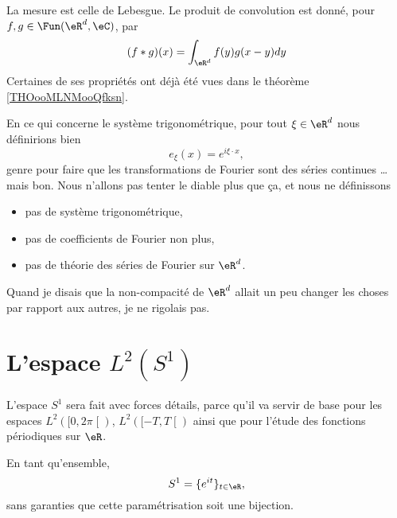 La mesure est celle de Lebesgue. Le produit de convolution est donné, pour \( f,g\in\Fun(\eR^d,\eC)\), par
\begin{equation}
    (f*g)(x)=\int_{\eR^d}f(y)g(x-y)dy
\end{equation}
Certaines de ses propriétés ont déjà été vues dans le théorème \ref{THOooMLNMooQfksn}.

En ce qui concerne le système trigonométrique, pour tout \( \xi\in \eR^d\) nous définirions bien
\begin{equation}
    e_{\xi}(x)= e^{i\xi\cdot x},
\end{equation}
genre pour faire que les transformations de Fourier sont des séries continues \ldots mais bon. Nous n'allons pas tenter le diable plus que ça, et nous ne définissons 
\begin{itemize}
    \item pas de système trigonométrique,
    \item pas de coefficients de Fourier non plus,
    \item pas de théorie des séries de Fourier sur \( \eR^d\).
\end{itemize}
Quand je disais que la non-compacité de \( \eR^d\) allait un peu changer les choses par rapport aux autres, je ne rigolais pas.

\section{L'espace \( L^2(S^1)\)}

L'espace \( S^1\) sera fait avec forces détails, parce qu'il va servir de base pour les espaces \( L^2(\mathopen[ 0 , 2\pi \mathclose[)\), \( L^2(\mathopen[ -T , T \mathclose[)\) ainsi que pour l'étude des fonctions périodiques sur \( \eR\).

En tant qu'ensemble,
\begin{equation}
    S^1=\{  e^{it} \}_{t\in \eR},
\end{equation}
sans garanties que cette paramétrisation soit une bijection.


